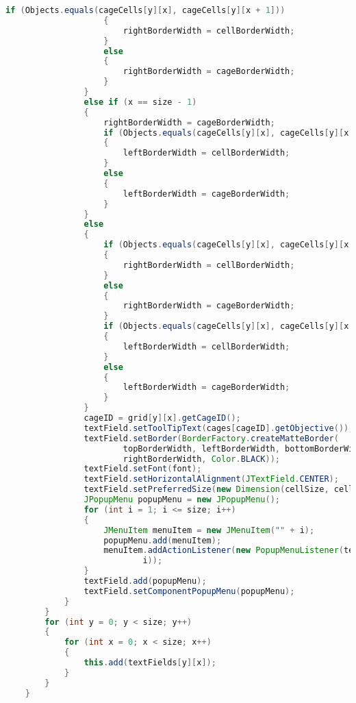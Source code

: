 \begin{lstlisting}[language=Java,basicstyle=\tiny,caption=GUI.java]
                    if (Objects.equals(cageCells[y][x], cageCells[y][x + 1]))
                    {
                        rightBorderWidth = cellBorderWidth;
                    }
                    else
                    {
                        rightBorderWidth = cageBorderWidth;
                    }
                }
                else if (x == size - 1)
                {
                    rightBorderWidth = cageBorderWidth;
                    if (Objects.equals(cageCells[y][x], cageCells[y][x - 1]))
                    {
                        leftBorderWidth = cellBorderWidth;
                    }
                    else
                    {
                        leftBorderWidth = cageBorderWidth;
                    }
                }
                else
                {
                    if (Objects.equals(cageCells[y][x], cageCells[y][x + 1]))
                    {
                        rightBorderWidth = cellBorderWidth;
                    }
                    else
                    {
                        rightBorderWidth = cageBorderWidth;
                    }
                    if (Objects.equals(cageCells[y][x], cageCells[y][x - 1]))
                    {
                        leftBorderWidth = cellBorderWidth;
                    }
                    else
                    {
                        leftBorderWidth = cageBorderWidth;
                    }
                }
                cageID = grid[y][x].getCageID();
                textField.setToolTipText(cages[cageID].getObjective());
                textField.setBorder(BorderFactory.createMatteBorder(
                        topBorderWidth, leftBorderWidth, bottomBorderWidth, 
                        rightBorderWidth, Color.BLACK));
                textField.setFont(font);
                textField.setHorizontalAlignment(JTextField.CENTER);
                textField.setPreferredSize(new Dimension(cellSize, cellSize));                
                JPopupMenu popupMenu = new JPopupMenu();                
                for (int i = 1; i <= size; i++)
                {
                    JMenuItem menuItem = new JMenuItem("" + i);
                    popupMenu.add(menuItem);
                    menuItem.addActionListener(new PopupMenuListener(textField, 
                            i));
                }                
                textField.add(popupMenu);
                textField.setComponentPopupMenu(popupMenu);
            }
        }
        for (int y = 0; y < size; y++)
        {
            for (int x = 0; x < size; x++)
            {
                this.add(textFields[y][x]);
            }
        }
    }
    

\end{lstlisting}

